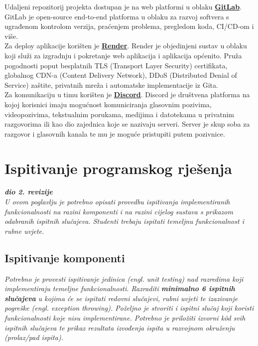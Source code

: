 			Udaljeni repozitorij projekta dostupan je na web platformi u oblaku \textbf{\href{https://gitlab.com/}{GitLab}}. GitLab je open-source end-to-end platforma u oblaku za razvoj softvera s ugrađenom kontrolom verzija, praćenjem problema, pregledom koda, CI/CD-om i više.\\
			Za deploy aplikacije korišten je \textbf{\href{https://render.com/}{Render}}. Render je objedinjeni sustav u oblaku koji služi za izgradnju i pokretanje web aplikacija i aplikacija općenito. Pruža pogodnosti poput besplatnih TLS (Transport Layer Security) certifikata, globalnog CDN-a (Content Delivery Network), DDoS (Distributed Denial of Service) zaštite, privatnih mreža i automatske implementacije iz Gita.\\
			Za komunikaciju u timu korišten je \textbf{\href{https://discord.com/}{Discord}}. Discord je društvena platforma na kojoj korisnici imaju mogućnost komuniciranja glasovnim pozivima, videopozivima, tekstualnim porukama, medijima i datotekama u privatnim razgovorima ili kao dio zajednica koje se nazivaju serveri. Server je skup soba za razgovor i glasovnih kanala te mu je moguće pristupiti putem pozivnice.\\
			
			
			\eject 
		
	
		\section{Ispitivanje programskog rješenja}
			
			\textbf{\textit{dio 2. revizije}}\\
			
			 \textit{U ovom poglavlju je potrebno opisati provedbu ispitivanja implementiranih funkcionalnosti na razini komponenti i na razini cijelog sustava s prikazom odabranih ispitnih slučajeva. Studenti trebaju ispitati temeljnu funkcionalnost i rubne uvjete.}
	
			
			\subsection{Ispitivanje komponenti}
			\textit{Potrebno je provesti ispitivanje jedinica (engl. unit testing) nad razredima koji implementiraju temeljne funkcionalnosti. Razraditi \textbf{minimalno 6 ispitnih slučajeva} u kojima će se ispitati redovni slučajevi, rubni uvjeti te izazivanje pogreške (engl. exception throwing). Poželjno je stvoriti i ispitni slučaj koji koristi funkcionalnosti koje nisu implementirane. Potrebno je priložiti izvorni kôd svih ispitnih slučajeva te prikaz rezultata izvođenja ispita u razvojnom okruženju (prolaz/pad ispita). }
			
